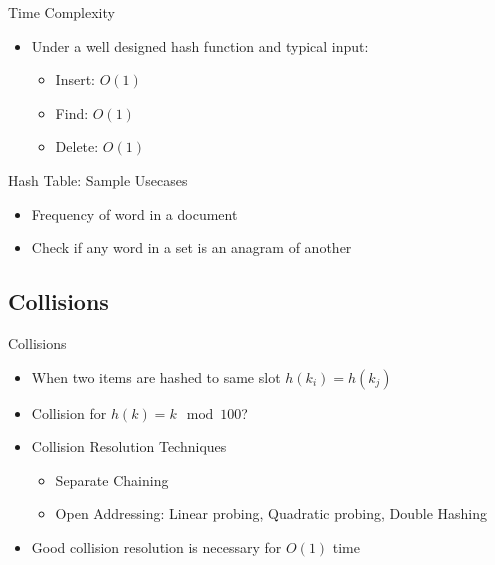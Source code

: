 \documentclass{beamer}
\begin{document}
\begin{frame}{Time Complexity}
    \begin{itemize}
        \item Under a well designed hash function and typical input:
        \begin{itemize}
            \item Insert: $O(1)$
            \item Find: $O(1)$
            \item Delete: $O(1)$
        \end{itemize}
    \end{itemize}
\end{frame}

\begin{frame}{Hash Table: Sample Usecases}
    \begin{itemize}
        \item Frequency of word in a document
        \item Check if any word in a set is an anagram of another
    \end{itemize}
\end{frame}

\subsection{Collisions}
\begin{frame}{Collisions}
    \begin{itemize}
        \item When two items are hashed to same slot $h(k_i) = h(k_j)$
        \item Collision for $h(k) = k \mod 100$?
        \item Collision Resolution Techniques
        \begin{itemize}
            \item Separate Chaining
            \item Open Addressing: Linear probing, Quadratic probing, Double Hashing
        \end{itemize}
        \item Good collision resolution is necessary for $O(1)$ time 
    \end{itemize}
\end{frame}
\end{document}
